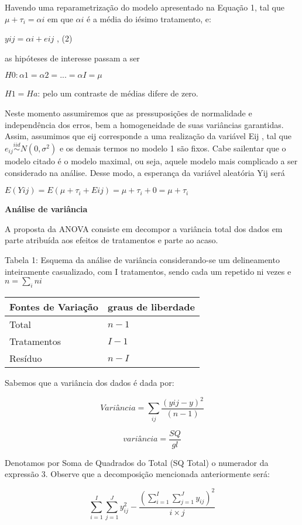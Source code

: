\documentclass[
]{book}
\begin{document}
Havendo uma reparametrização do modelo apresentado na Equação 1, tal que \(\mu + \tau_i = \alpha i\) em que \(\alpha i\) é a média do iésimo tratamento, e:

\(yij = \alpha i + eij\) , (2)

as hipóteses de interesse passam a ser

\(H0 : \alpha1 = \alpha2 = ... = \alpha I = \mu\)

\(H1 = Ha\): pelo um contraste de médias difere de zero.

Neste momento assumiremos que as pressuposições de normalidade e independência dos erros, bem a homogeneidade de suas variâncias garantidas. Assim, assumimos que eij corresponde a uma realização da variável Eij , tal que \(e_{ij} \overset{iid}{\sim} N(0,\sigma^2)\) e os demais termos no modelo 1 são fixos. Cabe sailentar que o modelo citado é o modelo maximal, ou seja, aquele modelo mais complicado a ser considerado na análise.
Desse modo, a esperança da variável aleatória Yij será

\(E(Yij ) = E(\mu + \tau_i + Eij ) = \mu + \tau_i + 0 = \mu + \tau_i\)

\textbf{Análise de variância}

A proposta da ANOVA consiste em decompor a variância total dos dados em parte atribuída aos efeitos de tratamentos e parte ao acaso.

Tabela 1: Esquema da análise de variância considerando-se um delineamento inteiramente casualizado, com I tratamentos, sendo cada um repetido ni vezes e \(n = \sum_i ni\)

\begin{longtable}[]{@{}ll@{}}
\toprule()
Fontes de Variação & graus de liberdade \\
\midrule()
\endhead
Total & \(n-1\) \\
Tratamentos & \(I-1\) \\
Resíduo & \(n-I\) \\
\bottomrule()
\end{longtable}

Sabemos que a variância dos dados é dada por:

\[Variância = \sum _{ij} \frac{(yij−y)^2}{(n−1)}\]

\[variância = \displaystyle{\frac{SQ}{gl}}\]

Denotamos por Soma de Quadrados do Total (SQ Total) o numerador da expressão 3. Observe que a decomposição mencionada anteriormente será:

\[\displaystyle{\sum_{i=1}^I\sum_{j=1}^Jy_{ij}^2-\frac{\left(\sum_{i=1}^I\sum_{j=1}^Jy_{ij}\right)^2}{i\times j}}\]
\end{document}
